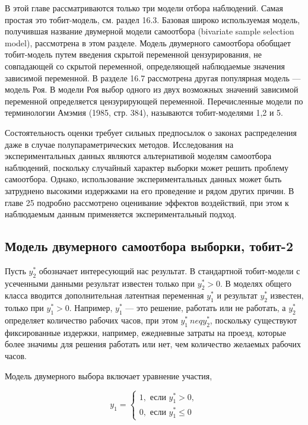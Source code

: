 В этой главе рассматриваются только три модели отбора наблюдений. Самая простая это тобит-модель, см. раздел 16.3. Базовая широко используемая модель, получившая название двумерной модели самоотбора (bivariate sample selection model), рассмотрена в этом разделе. Модель двумерного самоотбора обобщает тобит-модель путем введения скрытой переменной цензурирования, не совпадающей со скрытой переменной, определяющей наблюдаемые значения зависимой переменной. В разделе 16.7 рассмотрена другая популярная модель --- модель Роя. В модели Роя выбор одного из двух возможных значений зависимой переменной определяется цензурирующей переменной. Перечисленные модели по терминологии Амэмия (1985, стр. 384), называются тобит-моделями 1,2 и 5.


Состоятельность оценки требует сильных предпосылок о законах распределения даже в случае полупараметрических методов. Исследования на экспериментальных данных являются альтернативой моделям самоотбора наблюдений, поскольку случайный характер выборки может решить проблему самоотбора. Однако, использование экспериментальных данных может быть затруднено высокими издержками на его проведение и рядом других причин. В главе 25 подробно рассмотрено оценивание эффектов воздействий, при этом к наблюдаемым данным применяется экспериментальный подход.


\subsection{Модель двумерного самоотбора выборки, тобит-2}


Пусть $y^*_{2}$ обозначает интересующий нас результат. В стандартной тобит-модели с усеченными данными результат известен только при $y^* _{2}>0$. В моделях общего класса вводится дополнительная латентная переменная $y^* _1$ и результат $y^* _2$ известен, только при $y^* _{1}>0$. Например, $y^* _1$ --- это решение, работать или не работать, а $y^* _2$ определяет количество рабочих часов, при этом $y^* _1{\ neq}y^* _2$, поскольку существуют фиксированные издержки, например, ежедневные затраты на проезд, которые более значимы для решения работать или нет, чем количество желаемых рабочих часов.

Модель двумерного  выбора включает уравнение участия,

\begin{equation}
y_1=
\begin{cases}
1, \text{ если } y_1^{*}>0, \\
0, \text{ если } y_1^{*} \leq 0
\end{cases}
\end{equation}

